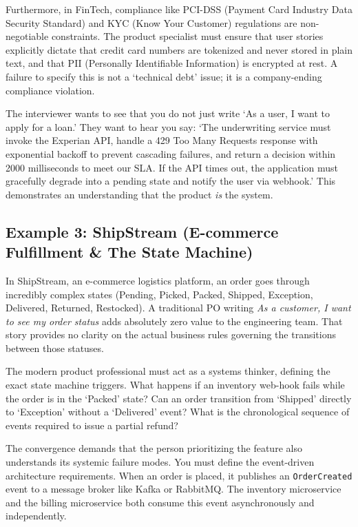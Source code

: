 \documentclass[
  11pt,
  openany,
  oneside]{book}
\begin{document}
Furthermore, in FinTech, compliance like PCI-DSS (Payment Card Industry
Data Security Standard) and KYC (Know Your Customer) regulations are
non-negotiable constraints. The product specialist must ensure that user
stories explicitly dictate that credit card numbers are tokenized and
never stored in plain text, and that PII (Personally Identifiable
Information) is encrypted at rest. A failure to specify this is not a
`technical debt' issue; it is a company-ending compliance violation.

The interviewer wants to see that you do not just write `As a user, I
want to apply for a loan.' They want to hear you say: `The underwriting
service must invoke the Experian API, handle a 429 Too Many Requests
response with exponential backoff to prevent cascading failures, and
return a decision within 2000 milliseconds to meet our SLA. If the API
times out, the application must gracefully degrade into a pending state
and notify the user via webhook.' This demonstrates an understanding
that the product \emph{is} the system.

\subsection{Example 3: ShipStream (E-commerce Fulfillment \& The State
Machine)}\label{example-3-shipstream-e-commerce-fulfillment-the-state-machine}

In ShipStream, an e-commerce logistics platform, an order goes through
incredibly complex states (Pending, Picked, Packed, Shipped, Exception,
Delivered, Returned, Restocked). A traditional PO writing \emph{As a
customer, I want to see my order status} adds absolutely zero value to
the engineering team. That story provides no clarity on the actual
business rules governing the transitions between those statuses.

The modern product professional must act as a systems thinker, defining
the exact state machine triggers. What happens if an inventory web-hook
fails while the order is in the `Packed' state? Can an order transition
from `Shipped' directly to `Exception' without a `Delivered' event? What
is the chronological sequence of events required to issue a partial
refund?

The convergence demands that the person prioritizing the feature also
understands its systemic failure modes. You must define the event-driven
architecture requirements. When an order is placed, it publishes an
\texttt{OrderCreated} event to a message broker like Kafka or RabbitMQ.
The inventory microservice and the billing microservice both consume
this event asynchronously and independently.
\end{document}
